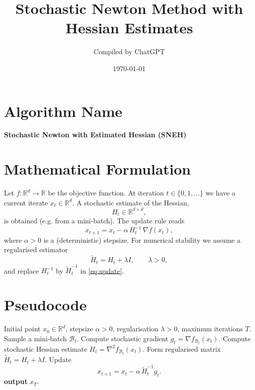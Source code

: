 \documentclass[11pt]{article}
\newcommand{\R}{\mathbb{R}}
\newcommand{\grad}{\nabla}
\newcommand{\Hess}{\nabla^{2}}
\begin{document}
\title{Stochastic Newton Method with Hessian Estimates}
\author{Compiled by ChatGPT}
\date{\today}
\maketitle

\section*{Algorithm Name}
\textbf{Stochastic Newton with Estimated Hessian (SNEH)}  

\section*{Mathematical Formulation}
Let $f:\R^{d}\rightarrow\R$ be the objective function.  
At iteration $t\in\{0,1,\dots\}$ we have a current iterate $x_{t}\in\R^{d}$.
A stochastic estimate of the Hessian,
\[
H_{t}\in\R^{d\times d},
\]
is obtained (e.g. from a mini‑batch).  
The update rule reads
\begin{equation}
\label{eq:update}
x_{t+1}=x_{t}-\alpha\,H_{t}^{-1}\,\grad f(x_{t}),
\end{equation}
where $\alpha>0$ is a (deterministic) stepsize.  
For numerical stability we assume a regularised estimator
\[
\widetilde H_{t}=H_{t}+\lambda I,\qquad \lambda>0,
\]
and replace $H_{t}^{-1}$ by $\widetilde H_{t}^{-1}$ in \eqref{eq:update}.

\section*{Pseudocode}
\begin{algorithm}[H]
\caption{Stochastic Newton with Estimated Hessian (SNEH)}\label{alg:sneh}
\begin{algorithmic}[1]
\Require Initial point $x_{0}\in\R^{d}$, stepsize $\alpha>0$, regularisation $\lambda>0$, maximum iterations $T$.
    \State Sample a mini‑batch $\mathcal{B}_{t}$.
    \State Compute stochastic gradient $g_{t}= \grad f_{\mathcal{B}_{t}}(x_{t})$.
    \State Compute stochastic Hessian estimate $H_{t}= \Hess f_{\mathcal{B}_{t}}(x_{t})$.
    \State Form regularised matrix $\widetilde H_{t}=H_{t}+\lambda I$.
    \State Update 
    \[
    x_{t+1}=x_{t}-\alpha\,\widetilde H_{t}^{-1} g_{t}.
    \]
\EndFor
\State \textbf{output} $x_{T}$.
\end{algorithmic}
\end{algorithm}
\end{document}
